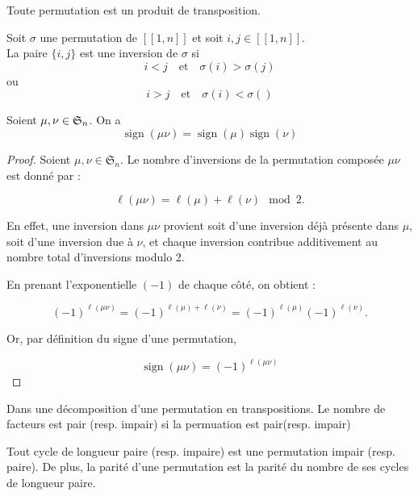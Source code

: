  \begin{corollaire}
        Toute permutation est un produit de transposition.
    \end{corollaire}

\begin{definition}
        Soit $\sigma$ une permutation de $[[1,n]]$ et soit $i,j\in [[1,n]]$.\\
        La paire $\{i,j\}$ est une inversion de $\sigma$ si
        \[
        i<j \quad \text{et} \quad \sigma(i)>\sigma(j)
        \]
        ou
        \[
        i>j \quad \text{et}\quad \sigma(i)<\sigma()
        \]
    \end{definition}

 \begin{proposition}
        Soient $\mu,\nu \in \mathfrak{S}_n$. On a
        \[
        \operatorname{sign}(\mu\nu)=\operatorname{sign}(\mu)\operatorname{sign}(\nu)
        \]
\end{proposition}

\begin{proof}
    
Soient \(\mu, \nu \in \mathfrak{S}_n\). Le nombre d’inversions de la permutation composée \(\mu\nu\) est donné par :

\[
\ell(\mu\nu) = \ell(\mu) + \ell(\nu) \mod 2.
\]

En effet, une inversion dans \(\mu\nu\) provient soit d’une inversion déjà présente dans \(\mu\), soit d’une inversion due à \(\nu\), et chaque inversion contribue additivement au nombre total d’inversions modulo 2.

En prenant l'exponentielle \( (-1) \) de chaque côté, on obtient :

\[
(-1)^{\ell(\mu\nu)} = (-1)^{\ell(\mu) + \ell(\nu)} = (-1)^{\ell(\mu)} (-1)^{\ell(\nu)}.
\]

Or, par définition du signe d’une permutation,

\[
\operatorname{sign}(\mu\nu) = (-1)^{\ell(\mu\nu)}
\]
\end{proof}

\begin{corollaire}
        Dans une décomposition d'une permutation en transpositions. Le nombre de facteurs est pair (resp. impair) si la permuation est pair(resp. impair)
    \end{corollaire}

\begin{corollaire}
        Tout cycle de longueur paire (resp. impaire) est une permutation impair (resp. paire). De plus, la parité d'une permutation est la parité du nombre de ses cycles de longueur paire.
    \end{corollaire}

